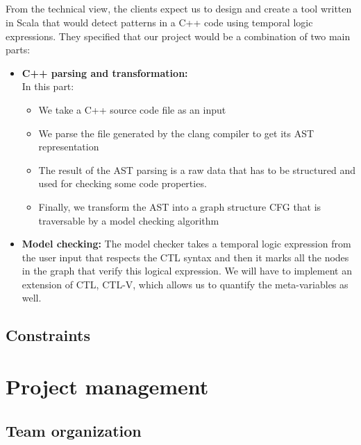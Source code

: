 \documentclass{report}
\begin{document}
\paragraph{}
\hspace{4mm}\textnormal{From the technical view, the clients expect us to design and create 
a tool written in Scala that would detect patterns in a C++ code
 using temporal logic expressions. They specified that our project 
would be a combination of two main parts: }

\vspace{3mm}
\begin{itemize}
\item \textbf{C++ parsing and transformation:}
\\
In this part:
\begin{itemize}
 \item We take a C++ source code file as an
 input
\item We parse the file generated by the clang compiler to get its 
AST representation
\item The result of the AST parsing is a raw data
 that has to be structured and used for checking some code properties.
 \item Finally, we transform the AST into a graph structure CFG that is 
traversable by a model checking algorithm
\end{itemize}\vspace{1mm}
\item \textbf{Model checking:} The model checker takes a temporal
 logic expression from the user input that respects the CTL
 syntax and then it marks all the nodes in the graph that verify this
 logical expression. We will have to implement an extension of 
CTL, CTL-V, which allows us to quantify the meta-variables as well.\vspace{1mm}
\end{itemize}

\section{Constraints}

\chapter{Project management}

\section{Team organization}
\end{document}
